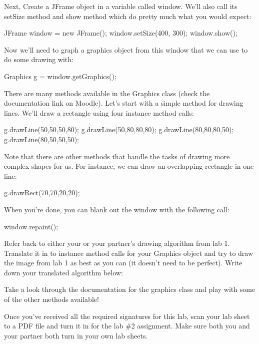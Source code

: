 Next, Create a JFrame object in a variable called window. We'll also call its setSize method and show method which do pretty much what you would expect:

\begin{code}
JFrame window = new JFrame();
window.setSize(400, 300);
window.show();
\end{code}

Now we'll need to graph a graphics object from this window that we can use to do some drawing with:

\begin{code}
Graphics g = window.getGraphics();
\end{code}

There are many methods available in the Graphics class (check the documentation link on Moodle). Let's start with a simple method for drawing lines. We'll draw a rectangle using four instance method calls:

\begin{code}
g.drawLine(50,50,50,80);
g.drawLine(50,80,80,80);
g.drawLine(80,80,80,50);
g.drawLine(80,50,50,50);
\end{code}

Note that there are other methods that handle the tasks of drawing more complex shapes for us. For instance, we can draw an overlapping rectangle in one line:

\begin{code}
g.drawRect(70,70,20,20);
\end{code}

When you're done, you can blank out the window with the following call:

\begin{code}
window.repaint();
\end{code}

\begin{exer}
Refer back to either your or your partner's drawing algorithm from lab 1. Translate it in to instance method calls for your Graphics object and try to draw the image from lab 1 as best as you can (it doesn't need to be perfect). Write down your translated algorithm below:

\evallinesix

\end{exer}

Take a look through the documentation for the graphics class and play with some of the other methods available!

\initialbox

Once you've received all the required signatures for this lab, scan your 
lab sheet to a PDF file and turn it in for the lab \#2 assignment. 
Make sure both you and your partner both turn in your own lab sheets. 
